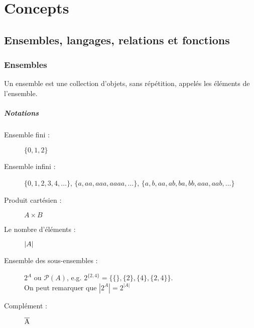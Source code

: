
\chapter{Concepts}
\label{ch:concepts}

\section{Ensembles, langages, relations et fonctions}
\label{sec:ensembles_langages_relations_et_fonctions}

\subsection{Ensembles}
\label{subsec:ensembles}
Un ensemble est une collection d'objets, sans répétition, appelés les éléments
de l'ensemble.
\paragraph{Notations}

\begin{description}
	\item [Ensemble fini :] $\{ 0, 1, 2\}$
	\item [Ensemble infini :] $\{ 0, 1, 2, 3, 4, \ldots\}$, $\{a, aa, aaa, aaaa, \ldots\}$, $\{a, b, aa, ab, ba, bb, aaa, aab, \ldots\}$
	\item [Produit cartésien :] $A \times B$
    \item [Le nombre d'éléments :] $\left\lvert A\right\lvert$
    \item [Ensemble des sous-ensembles :] $2^A$ ou $\mathcal{P}(A)$, e.g. $2^{\{2,4\}} = \{\{\}, \{2\}, \{4\}, \{2,4\}\}$. \\
      On peut remarquer que $|2^A| = 2^{|A|}$
	\item [Complément :] $\overline{\mathrm{A}}$
\end{description}


